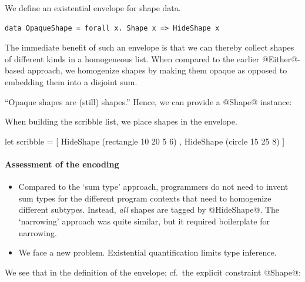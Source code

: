\documentclass{jfp}
\begin{document}
We define an existential envelope for shape data.

\begin{Verbatim}[fontsize=\small,commandchars=\\\{\}]
 data OpaqueShape = forall x. Shape x => HideShape x
\end{Verbatim}

The immediate benefit of such an envelope is that we can thereby
collect shapes of different kinds in a homogeneous list. When compared
to the earlier @Either@-based approach, we homogenize shapes by making
them opaque as opposed to embedding them into a disjoint sum.

``Opaque shapes are (still) shapes.'' Hence, we can provide a @Shape@
instance:



When building the scribble list, we place shapes in the envelope.

\begin{code}
 let scribble = [ HideShape (rectangle 10 20 5 6)
                , HideShape (circle 15 25 8)
                ]
\end{code}



\paragraph{Assessment of the encoding}

\mbox{}

\begin{itemize}

\item 
Compared to the `sum type' approach, programmers do not need to invent
sum types for the different program contexts that need to homogenize
different subtypes. Instead, \emph{all} shapes are tagged by
@HideShape@. The `narrowing' approach was quite similar, but it
required boilerplate for narrowing.

\smallskip

\item
We face a new problem. Existential quantification limits type
inference.

\end{itemize}
%
We see that in the definition of the envelope; cf.\ the explicit
constraint @Shape@:
\end{document}
